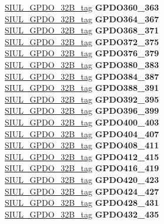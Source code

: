 \begin{DoxyCompactItemize}
\begin{tabbing}
\>\>\mbox{\hyperlink{unionSIUL__GPDO__32B__tag}{SIUL\_GPDO\_32B\_tag}} {\bfseries GPDO360\_363}\\
\>\>\mbox{\hyperlink{unionSIUL__GPDO__32B__tag}{SIUL\_GPDO\_32B\_tag}} {\bfseries GPDO364\_367}\\
\>\>\mbox{\hyperlink{unionSIUL__GPDO__32B__tag}{SIUL\_GPDO\_32B\_tag}} {\bfseries GPDO368\_371}\\
\>\>\mbox{\hyperlink{unionSIUL__GPDO__32B__tag}{SIUL\_GPDO\_32B\_tag}} {\bfseries GPDO372\_375}\\
\>\>\mbox{\hyperlink{unionSIUL__GPDO__32B__tag}{SIUL\_GPDO\_32B\_tag}} {\bfseries GPDO376\_379}\\
\>\>\mbox{\hyperlink{unionSIUL__GPDO__32B__tag}{SIUL\_GPDO\_32B\_tag}} {\bfseries GPDO380\_383}\\
\>\>\mbox{\hyperlink{unionSIUL__GPDO__32B__tag}{SIUL\_GPDO\_32B\_tag}} {\bfseries GPDO384\_387}\\
\>\>\mbox{\hyperlink{unionSIUL__GPDO__32B__tag}{SIUL\_GPDO\_32B\_tag}} {\bfseries GPDO388\_391}\\
\>\>\mbox{\hyperlink{unionSIUL__GPDO__32B__tag}{SIUL\_GPDO\_32B\_tag}} {\bfseries GPDO392\_395}\\
\>\>\mbox{\hyperlink{unionSIUL__GPDO__32B__tag}{SIUL\_GPDO\_32B\_tag}} {\bfseries GPDO396\_399}\\
\>\>\mbox{\hyperlink{unionSIUL__GPDO__32B__tag}{SIUL\_GPDO\_32B\_tag}} {\bfseries GPDO400\_403}\\
\>\>\mbox{\hyperlink{unionSIUL__GPDO__32B__tag}{SIUL\_GPDO\_32B\_tag}} {\bfseries GPDO404\_407}\\
\>\>\mbox{\hyperlink{unionSIUL__GPDO__32B__tag}{SIUL\_GPDO\_32B\_tag}} {\bfseries GPDO408\_411}\\
\>\>\mbox{\hyperlink{unionSIUL__GPDO__32B__tag}{SIUL\_GPDO\_32B\_tag}} {\bfseries GPDO412\_415}\\
\>\>\mbox{\hyperlink{unionSIUL__GPDO__32B__tag}{SIUL\_GPDO\_32B\_tag}} {\bfseries GPDO416\_419}\\
\>\>\mbox{\hyperlink{unionSIUL__GPDO__32B__tag}{SIUL\_GPDO\_32B\_tag}} {\bfseries GPDO420\_423}\\
\>\>\mbox{\hyperlink{unionSIUL__GPDO__32B__tag}{SIUL\_GPDO\_32B\_tag}} {\bfseries GPDO424\_427}\\
\>\>\mbox{\hyperlink{unionSIUL__GPDO__32B__tag}{SIUL\_GPDO\_32B\_tag}} {\bfseries GPDO428\_431}\\
\>\>\mbox{\hyperlink{unionSIUL__GPDO__32B__tag}{SIUL\_GPDO\_32B\_tag}} {\bfseries GPDO432\_435}\\

\end{tabbing}
\end{DoxyCompactItemize}
